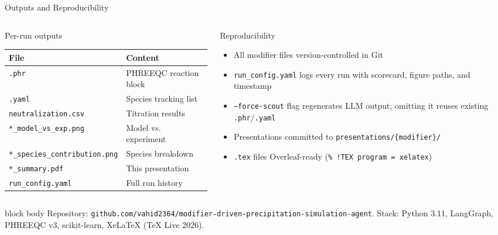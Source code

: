 \documentclass[8pt,aspectratio=169]{beamer}
\begin{document}
\begin{frame}{Outputs and Reproducibility}
  \begin{columns}[T]
    \begin{column}{0.48\textwidth}
      \begin{block}{Per-run outputs}
        \small
        \renewcommand{\arraystretch}{1.3}
        \begin{tabular}{@{}ll@{}}
          \toprule
          \textbf{File} & \textbf{Content} \\
          \midrule
          \texttt{.phr}           & PHREEQC reaction block \\
          \texttt{.yaml}          & Species tracking list \\
          \texttt{neutralization.csv} & Titration results \\
          \texttt{*\_model\_vs\_exp.png} & Model vs. experiment \\
          \texttt{*\_species\_contribution.png} & Species breakdown \\
          \texttt{*\_summary.pdf} & This presentation \\
          \texttt{run\_config.yaml} & Full run history \\
          \bottomrule
        \end{tabular}
      \end{block}
    \end{column}
    \begin{column}{0.48\textwidth}
      \begin{block}{Reproducibility}
        \begin{itemize}
          \setlength{\itemsep}{4pt}
          \item All modifier files version-controlled in Git
          \item \texttt{run\_config.yaml} logs every run with
                scorecard, figure paths, and timestamp
          \item \texttt{--force-scout} flag regenerates LLM output;
                omitting it reuses existing \texttt{.phr}/\texttt{.yaml}
          \item Presentations committed to
                \texttt{presentations/\{modifier\}/}
          \item \texttt{.tex} files Overleaf-ready
                (\texttt{\% !TEX program = xelatex})
        \end{itemize}
      \end{block}
    \end{column}
  \end{columns}
  \vspace{4pt}
  \begin{beamercolorbox}[rounded=true, shadow=false, wd=\textwidth]{block body}
    \tiny
    Repository: \texttt{github.com/vahid2364/modifier-driven-precipitation-simulation-agent}. Stack: Python 3.11, LangGraph, PHREEQC v3, scikit-learn, XeLaTeX (TeX Live 2026).
  \end{beamercolorbox}
\end{frame}
\end{document}

